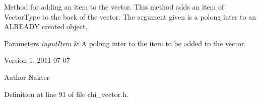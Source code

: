 Method for adding an item to the vector. This method adds an item of Vector\+Type to the back of the vector. The argument given is a polong inter to an A\+L\+R\+E\+A\+DY created object.


\begin{DoxyParams}{Parameters}
{\em input\+Item} & A polong inter to the item to be added to the vector.\\
\hline
\end{DoxyParams}
\begin{DoxyVersion}{Version}
1. 2011-\/07-\/07 
\end{DoxyVersion}
\begin{DoxyAuthor}{Author}
Nakter 
\end{DoxyAuthor}


Definition at line 91 of file chi\+\_\+vector.\+h.


